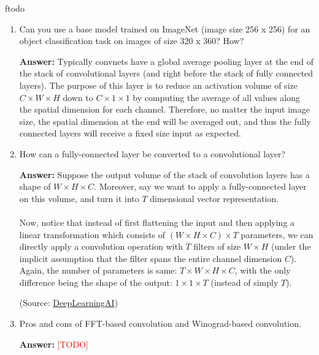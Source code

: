 ƒtodo\documentclass{article}
\newenvironment{QandA}{\begin{enumerate}[label=\arabic*.]}{\end{enumerate}}
\newenvironment{answer}{\par\normalfont \textbf{Answer:}}{}
\newcommand{\todo}{\textcolor{red}{[TODO]}}
\begin{document}
\begin{QandA}
    \item Can you use a base model trained on ImageNet (image size 256 x 256) for an object classification task on images of size 320 x 360? How?
    \begin{answer}
        Typically convnets have a global average pooling layer at the end of the stack of convolutional layers (and right before the stack of fully connected layers). The purpose of this layer is to reduce an activation volume of size $C \times W \times H$ down to $C \times 1 \times 1$ by computing the average of all values along the spatial dimension for each channel. Therefore, no matter the input image size, the spatial dimension at the end will be averaged out, and thus the fully connected layers will receive a fixed size input as expected.
    \end{answer}

    \item How can a fully-connected layer be converted to a convolutional layer?
    \begin{answer}
        Suppose the output volume of the stack of convolution layers has a shape of $W \times H \times C$.  Moreover, say we want to apply a fully-connected layer on this volume, and turn it into $T$ dimensional vector representation.\\\\
        Now, notice that instead of first flattening the input and then applying a linear transformation which consists of $(W \times H \times C) \times T$ parameters, we can directly apply a convolution operation with $T$ filters of size $W \times H$ (under the implicit assumption that the filter spans the entire channel dimension $C$). Again, the number of parameters is same: $T \times W \times H \times C$, with the only difference being the shape of the output: $1 \times 1 \times T$ (instead of simply $T$).

        (Source: \href{https://www.youtube.com/watch?v=XdsmlBGOK-k}{DeepLearningAI})
    \end{answer}

    \item Pros and cons of FFT-based convolution and Winograd-based convolution.
    \begin{answer}
        \todo
    \end{answer}
\end{QandA}
\end{document}

